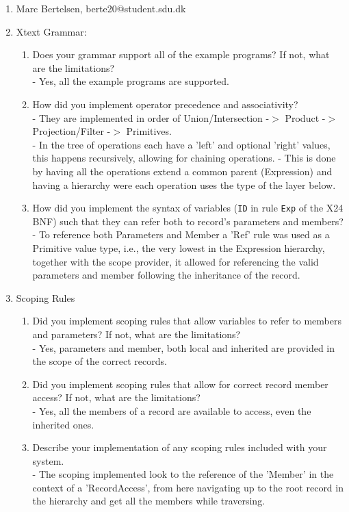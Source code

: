 \documentclass[12pt]{article}
\begin{document}
\begin{enumerate}
\item Marc Bertelsen, berte20@student.sdu.dk
\item Xtext Grammar:
  \begin{enumerate}
  \item Does your grammar support all of the example programs? If not, what are the limitations?\\
  - Yes, all the example programs are supported.
  \item How did you implement operator precedence and associativity?\\
  - They are implemented in order of Union/Intersection -\(>\) Product -\(>\) Projection/Filter -\(>\) Primitives.\\
  - In the tree of operations each have a 'left' and optional 'right' values, this happens recursively, allowing for chaining operations.
  - This is done by having all the operations extend a common parent (Expression) and having a hierarchy were each operation uses the type of the layer below.
  \item How did you implement the syntax of variables ({\tt ID} in rule {\tt Exp} of the X24 BNF) such that they can refer both to record's parameters and members?\\
  - To reference both Parameters and Member a 'Ref' rule was used as a Primitive value type, i.e., the very lowest in the Expression hierarchy, together with the scope provider, it allowed for referencing the valid parameters and member following the inheritance of the record. 
  \end{enumerate}
\item Scoping Rules
  \begin{enumerate}
    \item Did you implement scoping rules that allow variables to refer to members and parameters? If not, what are the limitations?\\
    - Yes, parameters and member, both local and inherited are provided in the scope of the correct records.
    \item Did you implement scoping rules that allow for correct record member access? If not, what are the limitations?\\
    - Yes, all the members of a record are available to access, even the inherited ones.
    \item Describe your implementation of any scoping rules included with your system.\\
    - The scoping implemented look to the reference of the 'Member' in the context of a 'RecordAccess', from here navigating up to the root record in the hierarchy and get all the members while traversing.\\

\end{enumerate}
\end{enumerate}
\end{document}
